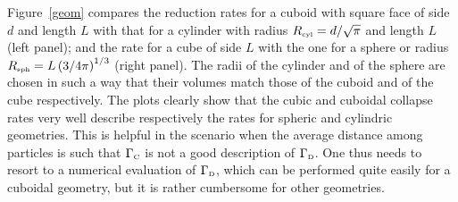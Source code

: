 \documentclass[11pt,onecolumn,amssymb,nofootinbib]{revtex4}
\begin{document}
Figure~\ref{geom} compares the reduction rates for a cuboid with square face of side $d$ and length $L$ with that for a cylinder with radius $R_\text{\tiny{cyl}}=d/\sqrt{\pi}$ and length $L$ (left panel); and the rate for a cube of side $L$ with the one for a sphere or radius $R_\text{\tiny{sph}}=L \left(3/4\pi\right)^{1/3}$ (right panel). The radii of the cylinder and of the sphere are chosen in such a way that their volumes match those of the cuboid and of the cube respectively.
The plots clearly show that the cubic and cuboidal collapse rates very well describe respectively the rates for spheric and cylindric geometries. %
This is helpful in the scenario when the average distance among particles is such that $\Gamma_\text{\tiny{C}}$ is not a good description of $\Gamma_\text{\tiny{D}}$. One thus needs to resort to a numerical evaluation of $\Gamma_\text{\tiny{D}}$, which can be performed quite easily for a cuboidal geometry, but it is rather cumbersome for other geometries.
\end{document}

